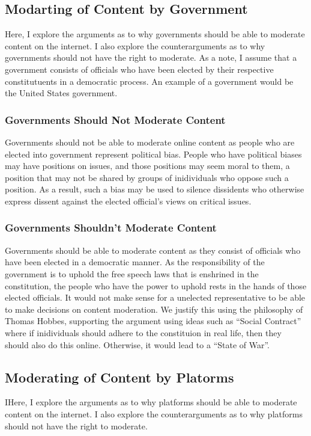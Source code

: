 \documentclass[a4paper]{article}
\begin{document}
\subsection{Modarting of Content by Government}
Here, I explore the arguments as to why governments should be able to moderate content on the internet. I also
explore the counterarguments as to why governments should not have the right to moderate. As a note, I assume that
a government consists of officials who have been elected by their respective constitutuents in a democratic process.
An example of a government would be the United States government.

\subsubsection{Governments Should Not Moderate Content}
Governments should not be able to moderate online content as people who are elected into government represent 
political bias. People who have political biases may have positions on issues, and those positions may seem moral 
to them, a position that may not be shared by groups of inidividuals who oppose such a position. As a result, such 
a bias may be used to silence dissidents who otherwise express dissent against the elected official's views on 
critical issues.

\subsubsection{Governments Shouldn't Moderate Content}
Governments should be able to moderate content as they consist of officials who have been elected in a democratic 
manner. As the responsibility of the government is to uphold the free speech laws that is enshrined in the 
constitution, the people who have the power to uphold rests in the hands of those elected officials. It would not make
sense for a unelected representative to be able to make decisions on content moderation. We justify this using the 
philosophy of Thomas Hobbes, supporting the argument using ideas such as ``Social Contract'' where if inidividuals
should adhere to the constituion in real life, then they should also do this online. Otherwise, it would lead to a 
``State of War''.

\subsection{Moderating of Content by Platorms}
IHere, I explore the arguments as to why platforms should be able to moderate content on the internet. I also explore
the counterarguments as to why platforms should not have the right to moderate.  
\end{document}
